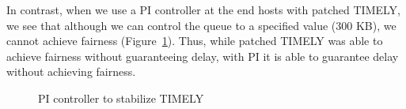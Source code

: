 In contrast, when we use a PI controller at the end hosts with patched
TIMELY, we see that although we can control the queue
to a specified value (300 KB), we cannot achieve fairness (Figure~\ref{fig:timely_pi}). 
Thus, while patched TIMELY was able to achieve fairness without guaranteeing
delay, with PI it is able to guarantee delay without
achieving fairness.

\begin{figure}
\center
{}
\vspace{-1em}
\caption{PI controller to stabilize TIMELY}
\label{fig:timely_pi}
\end{figure}
\fi


